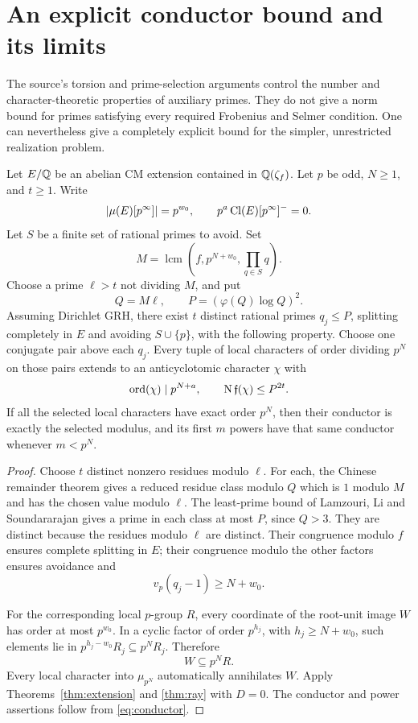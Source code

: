 \section{An explicit conductor bound and its limits}\label{sec:conductor}

The source's torsion and prime-selection arguments control the number and character-theoretic properties of auxiliary primes. They do not give a norm bound for primes satisfying every required Frobenius and Selmer condition. One can nevertheless give a completely explicit bound for the simpler, unrestricted realization problem.

\begin{theorem}\label{thm:bounded-conductor}
Let $E/\mathbb Q$ be an abelian CM extension contained in $\mathbb Q(\zeta_f)$. Let $p$ be odd, $N\ge1$, and $t\ge1$. Write
\[
 |\mu(E)[p^\infty]|=p^{w_0},\qquad
 p^a\operatorname{Cl}(E)[p^\infty]^{-}=0.
\]
Let $S$ be a finite set of rational primes to avoid. Set
\[
 M=\operatorname{lcm}\left(f,p^{N+w_0},\prod_{q\in S}q\right).
\]
Choose a prime $\ell>t$ not dividing $M$, and put
\[
 Q=M\ell,\qquad P=(\varphi(Q)\log Q)^2.
\]
Assuming Dirichlet GRH, there exist $t$ distinct rational primes $q_j\le P$, splitting completely in $E$ and avoiding $S\cup\{p\}$, with the following property. Choose one conjugate pair above each $q_j$. Every tuple of local characters of order dividing $p^N$ on those pairs extends to an anticyclotomic character $\chi$ with
\[
 \operatorname{ord}(\chi)\mid p^{N+a},\qquad
 \operatorname{N}\mathfrak f(\chi)\le P^{2t}.
\]
If all the selected local characters have exact order $p^N$, then their conductor is exactly the selected modulus, and its first $m$ powers have that same conductor whenever $m<p^N$.
\end{theorem}

\begin{proof}
Choose $t$ distinct nonzero residues modulo $\ell$. For each, the Chinese remainder theorem gives a reduced residue class modulo $Q$ which is $1$ modulo $M$ and has the chosen value modulo $\ell$. The least-prime bound of Lamzouri, Li and Soundararajan gives a prime in each class at most $P$, since $Q>3$.\cite{lls} They are distinct because the residues modulo $\ell$ are distinct. Their congruence modulo $f$ ensures complete splitting in $E$; their congruence modulo the other factors ensures avoidance and
\[
                       v_p(q_j-1)\ge N+w_0.
\]

For the corresponding local $p$-group $R$, every coordinate of the root-unit image $W$ has order at most $p^{w_0}$. In a cyclic factor of order $p^{h_j}$, with $h_j\ge N+w_0$, such elements lie in $p^{h_j-w_0}R_j\subseteq p^NR_j$. Therefore
\[
                              W\subseteq p^NR.
\]
Every local character into $\mu_{p^N}$ automatically annihilates $W$. Apply Theorems~\ref{thm:extension} and \ref{thm:ray} with $D=0$. The conductor and power assertions follow from \eqref{eq:conductor}.
\end{proof}


